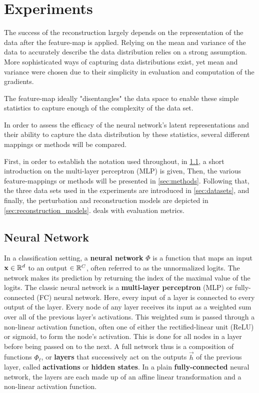 
\chapter{Experiments}
\label{chap:Experiments} 

The success of the reconstruction largely depends on the representation of the data
after the feature-map is applied.
Relying on the mean and variance of the data to accurately describe the data distribution 
relies on a strong assumption.
More sophisticated ways of capturing data distributions exist, yet mean and variance were chosen due to their simplicity in evaluation and computation of the gradients.

The feature-map ideally "disentangles" the data space to enable 
these simple statistics to capture enough of the complexity of the data set.

In order to assess the efficacy of the neural network's latent representations 
and their ability to capture the data distribution by these statistics,
several different mappings or methods will be compared. 

First, in order to establish the notation used throughout, in \cref{sec:nn_def}, 
a short introduction on the multi-layer perceptron (MLP) is given,
Then, the various feature-mappings or methods will be presented in \cref{sec:methods}.
Following that, the three data sets used in the experiments are introduced in \cref{sec:datasets},
and finally, the perturbation and reconstruction models are depicted in \cref{sec:reconstruction_models}.
 deals with evaluation metrics.

\section{Neural Network}
\label{sec:nn_def}

In a classification setting, a \textbf{neural network} $\Phi$ is a function that maps an input $\mathbf x \in \mathbb{R}^d$ to an output $\in \mathbb{R}^C$,
often referred to as the unnormalized logits. 
The network makes its prediction by returning the index of the maximal value of the logits.
The classic neural network is a \textbf{multi-layer perceptron} (MLP) or fully-connected (FC) neural network.
Here, every input of a layer is connected to every output of the layer.
Every node of any layer receives its input as a weighted sum over all of the previous layer's activations.
This weighted sum is passed through a non-linear activation function, often one of either the rectified-linear unit (ReLU) or sigmoid, to form the node's activation. 
This is done for all nodes in a layer before being passed on to the next.
A full network thus is a composition of functions $\Phi_\ell$, or \textbf{layers} that 
successively act on the outputs $\vec h$ of the previous layer, called \textbf{activations} or \textbf{hidden states}. 
In a plain \textbf{fully-connected} neural network, the layers are each made up of an affine linear transformation and a non-linear activation function.

